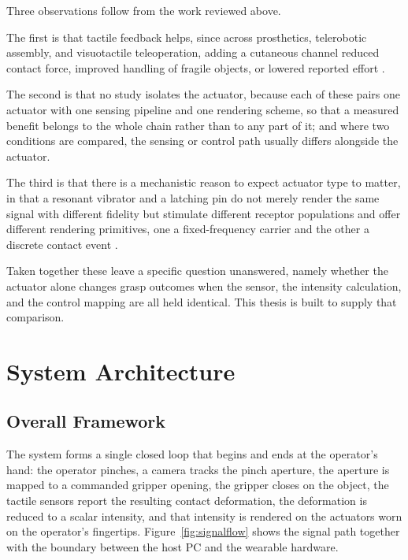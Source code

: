 \documentclass[12pt, a4paper, twoside, openright]{report}
\begin{document}
Three observations follow from the work reviewed above.

The first is that tactile feedback helps, since across prosthetics, telerobotic
assembly, and visuotactile teleoperation, adding a cutaneous channel reduced
contact force, improved handling of fragile objects, or lowered reported effort
\cite{chai2022,gong2024,coppola2022,becker2024}.

The second is that no study isolates the actuator, because each of these pairs
one actuator with one sensing pipeline and one rendering scheme, so that a
measured benefit belongs to the whole chain rather than to any part of it; and
where two conditions are compared, the sensing or control path usually differs
alongside the actuator.

The third is that there is a mechanistic reason to expect actuator type to
matter, in that a resonant vibrator and a latching pin do not merely render the
same signal with different fidelity but stimulate different receptor
populations and offer different rendering primitives, one a fixed-frequency
carrier and the other a discrete contact event
\cite{choi2013,vechev2019,johansson2009}.

Taken together these leave a specific question unanswered, namely whether the
actuator alone changes grasp outcomes when the sensor, the intensity
calculation, and the control mapping are all held identical. This thesis is
built to supply that comparison.

\chapter{System Architecture}
\label{ch:system}

\section{Overall Framework}
\label{sec:framework}

The system forms a single closed loop that begins and ends at the operator's
hand: the operator pinches, a camera tracks the pinch aperture, the aperture is
mapped to a commanded gripper opening, the gripper closes on the object, the
tactile sensors report the resulting contact deformation, the deformation is
reduced to a scalar intensity, and that intensity is rendered on the actuators
worn on the operator's fingertips. Figure~\ref{fig:signalflow} shows the signal
path together with the boundary between the host PC and the wearable
hardware.
\end{document}
